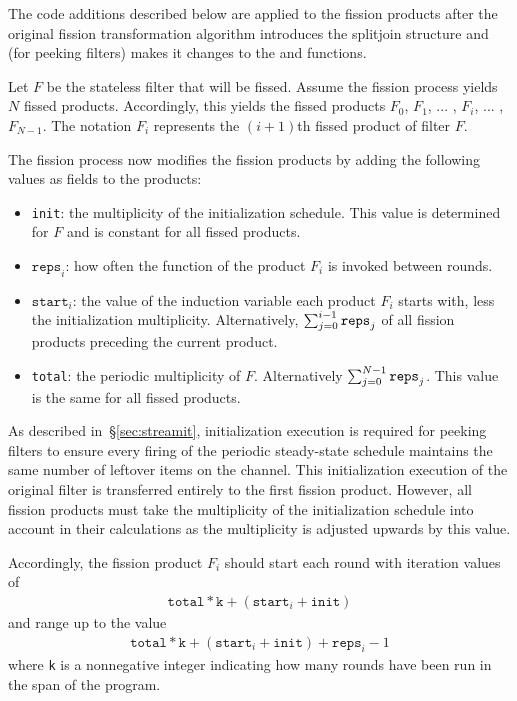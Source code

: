 The code additions described below are applied to the fission products
after the original fission transformation algorithm introduces the
splitjoin structure and (for peeking filters) makes it changes to the
\work and \prework functions.

Let $F$ be the stateless filter that will be fissed. Assume the
fission process yields $N$ fissed products. Accordingly, this yields
the fissed products $F_0$, $F_1$, ... , $F_i$, ... , $F_{N-1}$. The
notation $F_{i}$ represents the $(i+1)$th fissed product of filter
$F$.

The fission process now modifies the fission products by adding the
following values as fields to the products:
\begin{itemize}
    \item \texttt{init}: the multiplicity of the initialization schedule.  This value is determined for $F$ and is constant for all fissed products.
    \item $\texttt{reps}_i$: how often the \work function of the product $F_i$ is
      invoked between rounds.
    \item $\texttt{start}_i$: the value of the induction variable each product $F_i$ starts with, less the initialization multiplicity.  Alternatively, $\sum_{j=0}^{i-1}{\tt reps}_j$ of all fission products preceding the current product.
    \item \texttt{total}: the periodic multiplicity of $F$.  Alternatively $\sum_{j=0}^{N-1}{\tt reps}_j$. This value is the same for all fissed products.
\end{itemize}
As described in~\S\ref{sec:streamit}, initialization execution is required for peeking filters to ensure every firing of the periodic steady-state schedule maintains the same number of leftover items on the channel.  This initialization execution of the original filter is transferred entirely to the first fission product.  However, all fission products must take the multiplicity of the initialization schedule into account in their calculations as the multiplicity is adjusted upwards by this value.

Accordingly, the fission product $F_i$ should start each round with iteration values of
\begin{eqnarray*}
\texttt{total}*\texttt{k} + (\texttt{start}_i + \texttt{init})
\end{eqnarray*}
and range up to the value
\begin{eqnarray*}
\texttt{total}*\texttt{k} + (\texttt{start}_i + \texttt{init}) + \texttt{reps}_i - 1
\end{eqnarray*}
where \texttt{k} is a nonnegative integer indicating how many rounds have
been run in the span of the program.  

